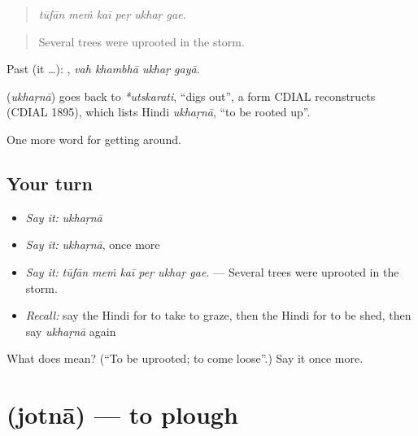 \begin{quote}
     
\end{quote}

\begin{quote}
\emph{tūfān meṁ kaī peṛ ukhaṛ gae.}
\end{quote}

\begin{quote}
Several trees were uprooted in the storm.
\end{quote}

Past (it …):    , \emph{vah khambhā ukhaṛ gayā}.

\begin{cousinweb}
\textbf{} (\emph{ukhaṛnā}) goes back to \emph{*utskarati}, \textquotedblleft{}digs out\textquotedblright{}, a form CDIAL reconstructs (CDIAL 1895), which lists Hindi \emph{ukhaṛnā}, \textquotedblleft{}to be rooted up\textquotedblright{}.
\end{cousinweb}

\begin{grammarlens}[title={What you've built}]
One more word for getting around.
\end{grammarlens}

\subsection*{Your turn}
\begin{itemize}
\raggedright
  \item \emph{Say it:} \emph{ukhaṛnā}
  \item \emph{Say it:} \emph{ukhaṛnā}, once more
  \item \emph{Say it:} \emph{tūfān meṁ kaī peṛ ukhaṛ gae.} — Several trees were uprooted in the storm.
  \item \emph{Recall:} say the Hindi for to take to graze, then the Hindi for to be shed, then say \emph{ukhaṛnā} again
\end{itemize}

\begin{tcolorbox}[breakable,colback=teal!4,colframe=teal!35!black,title={Before you move on}]
What does  mean? (\textquotedblleft{}To be uprooted; to come loose\textquotedblright{}.) Say it once more.
\end{tcolorbox}
\section[\texorpdfstring{\hi{जोतना} (jotnā)}{जोतना (jotnā)}]{ (jotnā) — to plough}

